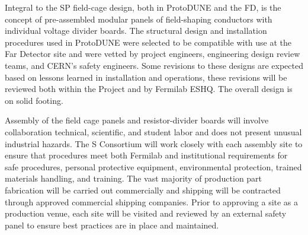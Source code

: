 Integral to the SP field-cage design, both in ProtoDUNE and the FD, is the concept of pre-assembled modular panels of field-shaping conductors with individual voltage divider boards. The structural design and installation procedures used in ProtoDUNE were selected to be compatible with use at the Far Detector site and were vetted by project engineers, engineering design review teams, and CERN's safety engineers. Some revisions to these designs are expected based on lessons learned in installation and operations, these revisions will be reviewed both within the Project and by Fermilab ESHQ. The overall design is on solid footing. 

Assembly of the field cage panels and resistor-divider boards will involve collaboration technical, scientific, and student labor and  does not present unusual industrial hazards. The S Consortium will work closely with each assembly site to ensure that procedures meet both Fermilab and institutional requirements for safe procedures, personal protective equipment, environmental protection, trained materials handling, and training. The vast majority of production part fabrication will be carried out commercially and shipping will be contracted through approved commercial shipping companies. Prior to approving a site as a production venue, each site will be visited and reviewed by an external safety panel to ensure best practices are in place and maintained. 

%



